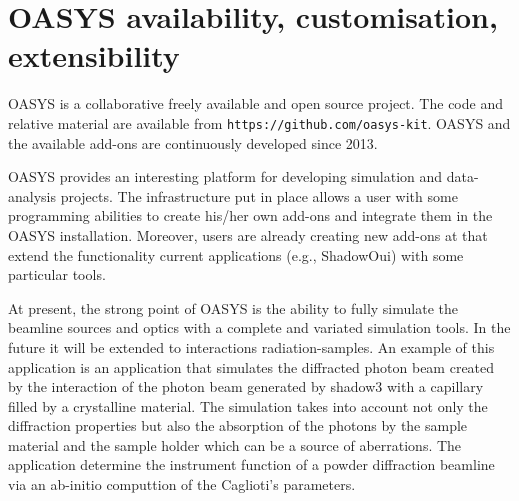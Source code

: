 \documentclass{aip-cp}
\begin{document}
\section{OASYS availability, customisation, extensibility}

OASYS is a collaborative freely available and open source project. The code and relative material are available from {\tt https://github.com/oasys-kit}.    OASYS and the available add-ons are continuously developed since 2013.

OASYS provides an interesting platform for developing simulation and data-analysis projects. The infrastructure put in place allows a user with some programming abilities to create his/her own add-ons and integrate them in the OASYS installation. Moreover, users are already creating new add-ons at that extend the functionality current applications (e.g., ShadowOui) with some particular tools. 

At present, the strong point of OASYS is the ability to fully simulate the beamline sources and optics with a complete and variated simulation tools. In the future it will be extended to interactions radiation-samples. An example of this application is an application that simulates the diffracted photon beam created by the interaction of the photon beam generated by shadow3 with a capillary filled by a crystalline material. The simulation takes into account not only the diffraction properties but also the absorption of the photons by the sample material and the sample holder which can be a source of aberrations. The application determine the instrument function of a powder diffraction beamline via an ab-initio  computtion of the Caglioti's parameters.

%
%
\end{document}
